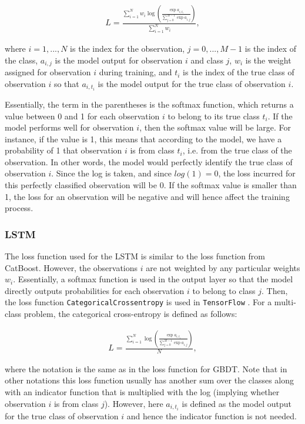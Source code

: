 \documentclass{article}
\begin{document}
	\begin{align}
	L = \frac{\sum_{i = 1}^N w_i \log \left(\frac{\exp a_{i, t_i}}{\sum_{j = 0}^{M-1} \exp a_{i, j}}\right)}{\sum_{i = 1}^N w_i}, 
	\end{align}
	
	where $i = 1, ..., N$ is the index for the observation, $j = 0, ..., M-1$ is the index of the class, $a_{i, j}$ is the model output for observation $i$ and class $j$, $w_i$ is the weight assigned for observation $i$ during training, and $t_i$ is the index of the true class of observation $i$ so that $a_{i, t_i}$ is the model output for the true class of observation $i$.
	
	Essentially, the term in the parentheses is the softmax function, which returns a value between 0 and 1 for each observation $i$ to belong to its true class $t_i$. If the model performs well for observation $i$, then the softmax value will be large. For instance, if the value is 1, this means that according to the model, we have a probability of 1 that observation $i$ is from class $t_i$, i.e. from the true class of the observation. In other words, the model would perfectly identify the true class of observation $i$. Since the log is taken, and since $log(1)=0$, the loss incurred for this perfectly classified observation will be 0. If the softmax value is smaller than 1, the loss for an observation will be negative and will hence affect the training process.
		
	\subsubsection{LSTM}
	
	The loss function used for the LSTM is similar to the loss function from CatBoost. However, the observations $i$ are not weighted by any particular weights $w_i$. Essentially, a softmax function is used in the output layer so that the model directly outputs probabilities for each observation $i$ to belong to class $j$. Then, the loss function \lstinline{CategoricalCrossentropy} is used in \lstinline{TensorFlow} \cite{noauthor_module:_nodate}. For a multi-class problem, the categorical cross-entropy is defined as follows:
	
	\begin{align}
	L = \frac{\sum_{i = 1}^N \log \left(\frac{\exp a_{i, t_i}}{\sum_{j = 0}^{M-1} \exp a_{i, j}}\right)}{N}, 
	\end{align}
	
	where the notation is the same as in the loss function for GBDT. Note that in other notations this loss function usually has another sum over the classes along with an indicator function that is multiplied with the log (implying whether observation $i$ is from class $j$). However, here $a_{i, t_i}$ is defined as the model output for the true class of observation $i$ and hence the indicator function is not needed.
	
\end{document}
